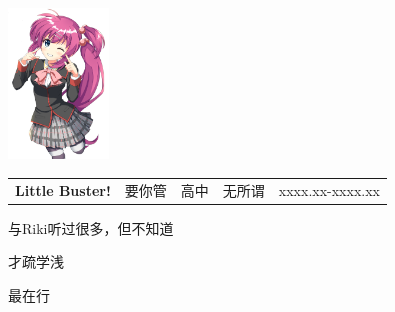 \documentclass{cv}
\begin{document}
   \addPageColorBars


      \begin{minipage}[t]{0.55\textwidth}
           \\
         \vfill
            \\
         \vfill
              \\
         \vfill
         \\
         \vfill
              \\
         \vfill
         \vfill
   \end{minipage}
   \hfill
   \begin{adjustbox}{valign=t, max height=0.2\textheight}
      \includegraphics[width=0.2\textwidth]{avatar.png} 
   \end{adjustbox}
   \vspace{5pt}


   \vspace{5pt}
   \begin{tabularx}{\textwidth}{XXXXX}
      \textbf{Little Buster!} & 要你管& 高中 & 无所谓 & xxxx.xx-xxxx.xx\\
   \end{tabularx}
   \vspace{5pt}

\noindent
\begin{description}[topsep=5pt,leftmargin=0pt,itemsep=0.8pt ]
    \item[Music：] 与Riki听过很多，但不知道
    \item[烹饪：] 才疏学浅
    \item[添麻烦：]最在行 
\end{description}
\vspace{5pt}
\end{document}
